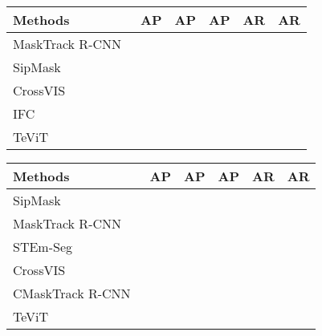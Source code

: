 \documentclass[10pt,twocolumn,letterpaper]{article}
\begin{document}
\begin{table*}
\centering
\begin{minipage}[t]{0.49\linewidth}
\centering
\renewcommand\arraystretch{1.17}
\renewcommand\tabcolsep{3.5pt}
\begin{small}
\begin{tabular}{l|ccccc}
\hline

\hline
\rowcolor{mygray}
Methods & AP & AP & AP & AR & AR \\
\hline
\hline
MaskTrack R-CNN~\cite{vis, crossvis} &  &  &  &  &  \\
SipMask~\cite{sipmask, crossvis} &  &  &  &  &  \\
CrossVIS~\cite{crossvis} &  &  &  &  &  \\
IFC~\cite{ifc} &  &  &  &  &  \\
TeViT &  &  &  &  &  \\
\hline

\hline
\end{tabular}
\end{small}
\caption{Comparisons with previous VIS methods on YouTube-VIS- datasets. Methods with superscript ``" are reported in~\cite{crossvis}.
}
\label{tab:vis2021}
\end{minipage}
\hfill
\begin{minipage}[t]{0.49\linewidth}
\centering
\renewcommand\arraystretch{1}
\renewcommand\tabcolsep{3.5pt}
\begin{small}
\begin{tabular}{l|ccccc}
\hline

\hline
\rowcolor{mygray}
Methods 
& AP 
& AP 
& AP 
& AR 
& AR 
\\
\hline
\hline
SipMask~\cite{sipmask, crossvis} &  &  &  &  &  \\
MaskTrack R-CNN~\cite{vis, crossvis} &  &  &  &  &  \\
STEm-Seg~\cite{stemseg, ovis} &  &  &  &  &  \\
CrossVIS~\cite{crossvis} &  &  &  &  &  \\
CMaskTrack R-CNN~\cite{ovis} &  &  &  &  &  \\
TeViT &  &  &  &  &  \\
\hline

\hline
\end{tabular}
\end{small}
\caption{Comparisons on OVIS dataset. Methods with superscript ``" and ``"  are reported in~\cite{crossvis} and~\cite{ovis} respectively.
}
\label{tab:ovis}
\end{minipage}
\end{table*}
\end{document}
